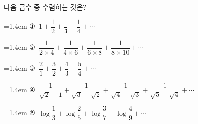 다음 급수 중 수렴하는 것은?
\par\medskip\par\noindent\hangindent=1.4em {\small ①}\ $1+\dfrac{1}{2}+\dfrac{1}{3}+\dfrac{1}{4}+\cdots$\par\noindent\hangindent=1.4em {\small ②}\ $\dfrac{1}{2\times 4}+\dfrac{1}{4\times 6}+\dfrac{1}{6\times 8}+\dfrac{1}{8\times 10}+\cdots$\par\noindent\hangindent=1.4em {\small ③}\ $\dfrac{2}{1}+\dfrac{3}{2}+\dfrac{4}{3}+\dfrac{5}{4}+\cdots$\par\noindent\hangindent=1.4em {\small ④}\ $\dfrac{1}{\sqrt{2}-1}+\dfrac{1}{\sqrt{3}-\sqrt{2}}+\dfrac{1}{\sqrt{4}-\sqrt{3}}+\dfrac{1}{\sqrt{5}-\sqrt{4}}+\cdots$\par\noindent\hangindent=1.4em {\small ⑤}\ $\log\dfrac{1}{3}+\log\dfrac{2}{5}+\log\dfrac{3}{7}+\log\dfrac{4}{9}+\cdots$\par\medskip
